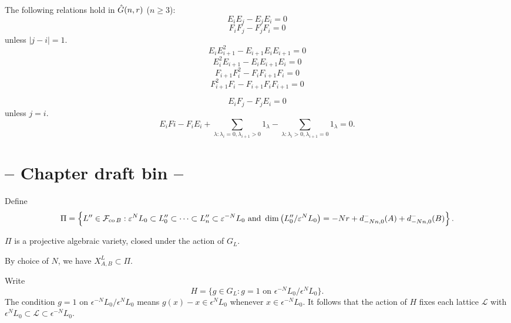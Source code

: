 \documentclass[a4paper, 11pt]{report}
\begin{document}
\begin{lemma}
The following relations hold in $\hat{G}(n,r)$ ($n\geq 3$):
\begin{equation*}
E_iE_j - E_jE_i = 0
\end{equation*}
\begin{equation*}
F_iF_j - F_jF_i = 0
\end{equation*}
unless $|j-i|=1$.
\begin{equation*}
E_iE_{i+1}^2 - E_{i+1}E_iE_{i+1} = 0
\end{equation*}
\begin{equation*}
E_i^2E_{i+1} - E_iE_{i+1}E_i = 0
\end{equation*}
\begin{equation*}
F_{i+1}F_i^2 - F_iF_{i+1}F_i = 0
\end{equation*}
\begin{equation*}
F_{i+1}^2F_i - F_{i+1}F_iF_{i+1} = 0
\end{equation*}

\begin{equation*}
E_iF_j - F_jE_i = 0
\end{equation*}
unless $j=i$.
\begin{equation*}
E_iFi - F_iE_i + \sum_{\lambda:\lambda_i = 0,\lambda_{i+1}>0} 1_\lambda - \sum_{\lambda:\lambda_i>0, \lambda_{i+1}=0} 1_\lambda = 0.
\end{equation*}
\end{lemma}


\section{ -- Chapter draft bin -- }

Define
\begin{equation*}
\Pi = \left\{L''\in\mathcal{F}_{\operatorname{co}{B}} : \varepsilon^N L_0 \subset L_0''\subset\cdots\subset L_n''\subset \varepsilon^{-N} L_0 \text{ and } \dim\left(L_0''/{\varepsilon^N L_0}\right) = -Nr + d_{-Nn,0}^-(A) + d_{-Nn,0}^-(B) \right\}.
\end{equation*}

\begin{lemma}
$\Pi$ is a projective algebraic variety, closed under the action of $G_L$.
\end{lemma}

By choice of $N$, we have $X_{A,B}^L\subset\Pi$.

Write
\begin{equation*}
H = \{g\in G_L: g=1 \text{ on } \epsilon^{-N}L_0/{\epsilon^N L_0}\}.
\end{equation*}
The condition $g=1$ on $\epsilon^{-N}L_0/{\epsilon^N L_0}$ means $g(x) - x\in \epsilon^N L_0$ whenever $x\in\epsilon^{-N} L_0$. It follows that the action of $H$ fixes each lattice $\mathcal{L}$ with $\epsilon^N L_0\subset \mathcal{L}\subset \epsilon^{-N}L_0$.
\end{document}
